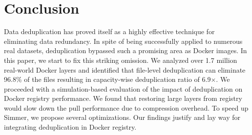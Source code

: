 \section{Conclusion}
\label{sec:conclusion}

Data deduplication has proved itself as a highly effective technique for
eliminating data redundancy.
%
In spite of being successfully applied to numerous real datasets, deduplication
bypassed such a promising area as Docker images.
%
In this paper, we start to fix this striking omission.
%
We analyzed over 1.7 million real-world Docker layers and identified that
file-level deduplication can eliminate 96.8\% of the files resulting in
capacity-wise deduplication ratio of 6.9$\times$.
%
We proceeded with a simulation-based evaluation of the impact of deduplication
on Docker registry performance.
%
We found that restoring large layers from registry would slow down the pull performance due to compression overhead. To speed up Simmer, we propose several optimizations.
%
%
Our findings justify and lay way for integrating deduplication in Docker
registry.


